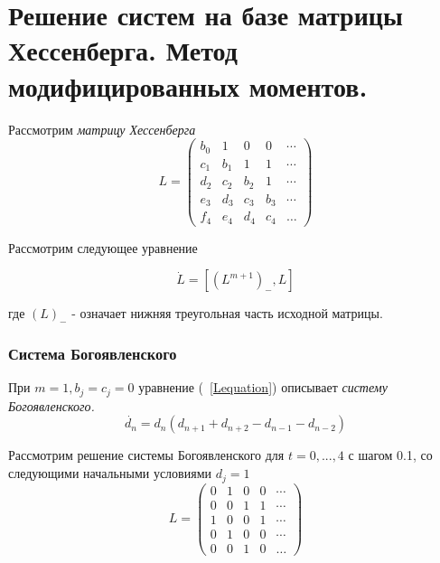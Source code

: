 \documentclass[12pt, a4paper]{report}
\begin{document}
\chapter {Решение систем на базе матрицы Хессенберга. Метод модифицированных моментов.}
Рассмотрим \it матрицу Хессенберга \rm
\begin{equation}
\label{Hessenberg}
L=
\left(\begin{array}{cccccccccccc}
b_0 & 1 & 0 & 0 &  \cdots \\
c_1 & b_1 & 1 & 1 &  \cdots \\
d_2 & c_2 & b_2 & 1 &  \cdots \\
e_3 & d_3 & c_3 & b_3 &  \cdots \\
f_4 & e_4 & d_4 & c_4 & \ldots
\end{array}\right)
\end{equation}

Рассмотрим следующее уравнение

\begin{equation}
\label{Lequation}
\dot{L}=[(L^{m+1})_{-},L]
\end{equation}

где $(L)_{-}$ - означает нижняя треугольная часть исходной матрицы. \\


\subsection {Система Богоявленского}
При $m=1, b_j = c_j = 0$ уравнение (~\ref{Lequation}) описывает \it систему Богоявленского.\rm
$$
\dot{d_n}=d_n(d_{n+1}+d_{n+2}-d_{n-1}-d_{n-2})
$$

Рассмотрим решение системы Богоявленского для $t=0, ...,4$  с шагом 0.1, со следующими начальными условиями $d_j = 1$ \\
$$
L=
\left(\begin{array}{cccccccccccc}
0 & 1 & 0 & 0 &  \cdots \\
0 & 0 & 1 & 1 &  \cdots \\
1 & 0 & 0 & 1 &  \cdots \\
0 & 1 & 0 & 0 &  \cdots \\
0 & 0 & 1 & 0 & \ldots
\end{array}\right)
$$
\end{document}
